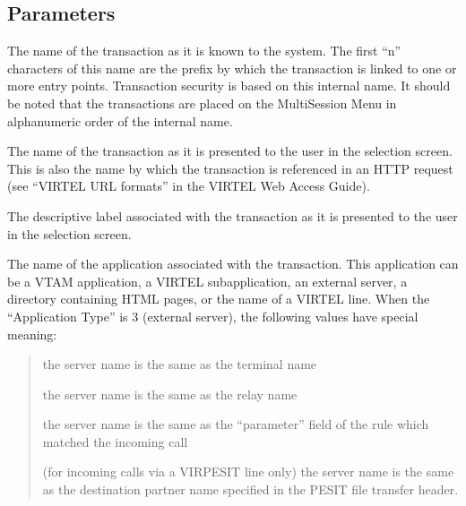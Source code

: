 \documentclass[letterpaper,10pt,english]{sphinxmanual}
\begin{document}
\subsection{Parameters}
\label{\detokenize{connectivity_guide:index-118}}\label{\detokenize{connectivity_guide:id67}}\begin{description}
\sphinxAtStartPar
The name of the transaction as it is known to the system. The first “n” characters of this name are the prefix by which the transaction is linked to one or more entry points. Transaction security is based on this internal name. It should be noted that the transactions are placed on the Multi\sphinxhyphen{}Session Menu in alphanumeric order of the internal name.

\sphinxAtStartPar
The name of the transaction as it is presented to the user in the selection screen. This is also the name by which the transaction is referenced in an HTTP request (see “VIRTEL URL formats” in the VIRTEL Web Access Guide).

\sphinxAtStartPar
The descriptive label associated with the transaction as it is presented to the user in the selection screen.

\sphinxAtStartPar
The name of the application associated with the transaction. This application can be a VTAM application, a VIRTEL sub\sphinxhyphen{}application, an external server, a directory containing HTML pages, or the name of a VIRTEL line. When the “Application Type” is 3 (external server), the following values have special meaning:
\begin{quote}
\begin{description}
\sphinxAtStartPar
the server name is the same as the terminal name

\sphinxAtStartPar
the server name is the same as the relay name

\sphinxAtStartPar
the server name is the same as the “parameter” field of the rule which matched the incoming call

\sphinxlineitem{=}
\sphinxAtStartPar
(for incoming calls via a VIRPESIT line only) the server name is the same as the destination partner name specified in the PESIT file transfer header.

\end{description}
\end{quote}


\end{description}
\end{document}
